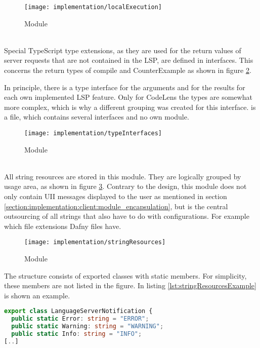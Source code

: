 \begin{figure}[H]
    \centering
    \texttt{[image: implementation/localExecution]}
    \caption{Module }
    \label{fig:localExecution}
\end{figure}

\textbf{}\\
Special TypeScript type extensions,
as they are used for the return values of server requests
that are not contained in the LSP, are defined in interfaces.
This concerns the return types of compile and CounterExample as shown in figure \ref{fig:typeInterfaces}.

In principle, there is a type interface for the arguments and for the results for each own implemented LSP feature.
Only for CodeLens the types are somewhat more complex, which is why a different grouping was created for this interface.
 is a file, which contains several interfaces and no own module.

\begin{figure}[H]
    \centering
    \texttt{[image: implementation/typeInterfaces]}
    \caption{Module }
    \label{fig:typeInterfaces}
\end{figure}

\textbf{}\\
All string resources are stored in this module.
They are logically grouped by usage area, as shown in figure \ref{fig:stringResources}.
Contrary to the design, this module does not only contain UII messages displayed to the user as mentioned in section
\ref{section:implementation:client:module_encapsulation},
but is the central outsourcing of all strings that also have to do with configurations.
For example which file extensions Dafny files have.

\begin{figure}[H]
    \centering
    \texttt{[image: implementation/stringResources]}
    \caption{Module }
    \label{fig:stringResources}
\end{figure}

The structure consists of exported classes with static members. For simplicity, these members are not listed in the figure.
In listing \ref{lst:stringResourcesExample} is shown an example.

\begin{lstlisting}[language=typescript, caption={Excerpt from class \code{LanguageServerNotification}}, captionpos=b, label={lst:stringResourcesExample}]
export class LanguageServerNotification {
  public static Error: string = "ERROR";
  public static Warning: string = "WARNING";
  public static Info: string = "INFO";
[..]
\end{lstlisting}

